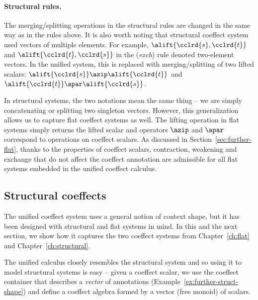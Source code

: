 \paragraph{Structural rules.}
The merging/splitting operations in the structural rules are changed in the same way as in the
rules above. It is also worth noting that structural coeffect system used vectors of multiple
elements. For example, $\alift{\cclrd{s},\cclrd{t}}$ and $\alift{\cclrd{t},\cclrd{s}}$ in the (\emph{exch})
rule denoted two-element vectors. In the unified system, this is replaced with merging/splitting
of two lifted scalars: $\alift{\cclrd{s}} \azip \alift{\cclrd{t}}$ and $\alift{\cclrd{t}} \apar \alift{\cclrd{s}}$.

In structural systems, the two notations mean the same thing -- we are simply concatenating or splitting two
singleton vectors. However, this generalization allows us to capture flat coeffect systems as well.
The lifting operation in flat systems simply returns the lifted scalar and operators $\azip$ and
$\apar$ correspond to operations on coeffect scalars. As discussed in Section~\ref{sec:further-flat},
thanks to the properties of coeffect scalars, contraction, weakening and exchange that do not
affect the coeffect annotation are admissible for all flat systems embedded in the unified
coeffect calculus.


\subsection{Structural coeffects}
\label{sec:further-structural}

The unified coeffect system uses a general notion of context shape, but it has been designed with
structural and flat systems in mind. In this and the next section, we show how it captures
the two coeffect systems from Chapter~\ref{ch:flat} and Chapter~\ref{ch:structural}.

The unified calculus closely resembles the structural system and so using it to model structural
systems is easy -- given a coeffect scalar, we use the coeffect container that describes a \emph{vector}
of annotations (Example~\ref{ex:further-struct-shape}) and define a coeffect algebra formed by
a vector (free monoid) of scalars.

